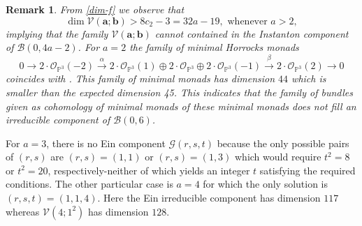 \documentclass[twoside,reqno]{amsart}
\theoremstyle{plain}
\newtheorem{remark}[theorem]{Remark}
\newcommand{\E}{\mathcal{E}}
\begin{document}
\begin{remark}\label{rmk1}
From \eqref{dim-f} we observe that 
 $$\dim\mathcal{V}(\boldsymbol{a};\boldsymbol{b})>8c_2-3=32a-19, \mbox{ whenever } a>2,$$
 implying that the family $\mathcal{V}(\boldsymbol{a};\boldsymbol{b})$ cannot contained in the Instanton component 
 of $\mathcal{B}(0,4a-2)$. For $a=2$ the family of minimal Horrocks monads
\begin{equation}
0\rightarrow2\cdot\mathcal{O}_{\mathbb{P}^{3}}(-2)\stackrel{\alpha}{\rightarrow}2\cdot\mathcal{O}_{\mathbb{P}^{3}}(1)\oplus2\cdot\mathcal{O}_{\mathbb{P}^{3}}\oplus 2\cdot\mathcal{O}_{\mathbb{P}^{3}}(-1)\stackrel{\beta}{\rightarrow}2\cdot\mathcal{O}_{\mathbb{P}^{3}}(2)\rightarrow0
\end{equation}
coincides with \cite[Table 5.3, $c_2=6$, (3)]{HR91}. This family of minimal monads has dimension $44$ which is smaller than the expected dimension 45. This indicates that the family of bundles given as cohomology of minimal monads of these minimal monads does not fill an irreducible component of $\mathcal{B}(0,6)$. 
\end{remark}

For $a=3$, there is no Ein component $\mathcal{G}(r,s,t)$ because the only possible pairs of $(r,s)$ are $(r,s)=(1,1)$ or $(r,s)=(1,3)$ which would require $t^2=8$ or $t^2=20$, respectively-neither of which yields an integer 
$t$ satisfying the required conditions. The other particular case is $a=4$ for which the only solution is 
$(r,s,t)=(1,1,4)$. Here the Ein irreducible component has dimension $117$ 
whereas $\mathcal{V}(4;1^2)$ has dimension $128$.
\end{document}
